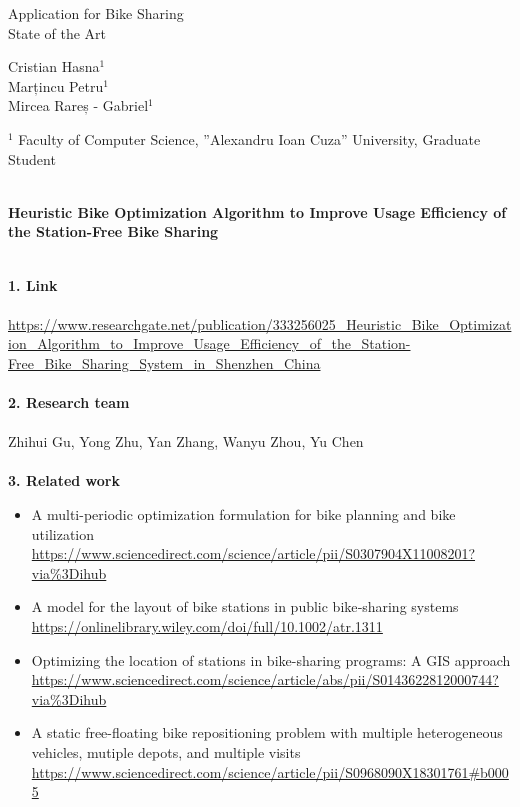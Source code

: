 \documentclass[a4paper]{article}
\begin{document}

\Large
 \begin{center}
Application for Bike Sharing\\ 
State of the Art

\hspace{10pt}

\large
Cristian Hasna$^1$ \\
Marțincu Petru$^1$ \\
Mircea Rareș - Gabriel$^1$ \\

\hspace{10pt}

\small  
$^1$ Faculty of Computer Science, ”Alexandru Ioan Cuza” University, Graduate Student\\ 

\end{center}

\hspace{10pt}

\ \\\textbf{Heuristic Bike Optimization Algorithm to Improve Usage Efficiency of the Station-Free Bike Sharing}


\normalsize

\ \\
\textbf{1. Link}
\ \\ \ \\
\url{https://www.researchgate.net/publication/333256025_Heuristic_Bike_Optimization_Algorithm_to_Improve_Usage_Efficiency_of_the_Station-Free_Bike_Sharing_System_in_Shenzhen_China}
\ \\ \ \\
\textbf{2. Research team}
\ \\ \ \\
Zhihui Gu, Yong Zhu, Yan Zhang, Wanyu Zhou, Yu Chen
\ \\ \ \\
\textbf{3. Related work}
\begin{itemize}
\item A multi-periodic optimization formulation for bike planning and bike utilization \\ \url{https://www.sciencedirect.com/science/article/pii/S0307904X11008201?via%3Dihub} \ \\
\item A model for the layout of bike stations in public bike‐sharing systems \\\url{https://onlinelibrary.wiley.com/doi/full/10.1002/atr.1311}\ \\ 
\item Optimizing the location of stations in bike-sharing programs: A GIS approach \\ \url{https://www.sciencedirect.com/science/article/abs/pii/S0143622812000744?via\%3Dihub} \\
\item A static free-floating bike repositioning problem with multiple heterogeneous vehicles, mutiple depots, and multiple visits \\
\url{https://www.sciencedirect.com/science/article/pii/S0968090X18301761#b0005}
\end{itemize}
\end{document}
